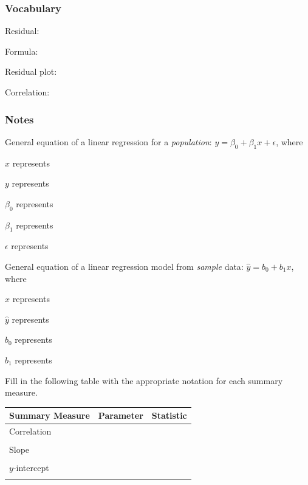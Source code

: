 \documentclass[
]{report}
\newcommand{\rgs}{\vspace{12pt}} %
\newcommand{\rgi}{\hspace{24pt}}  %
\begin{document}

\hypertarget{vocabulary-6}{%
\subsubsection*{Vocabulary}\label{vocabulary-6}}

Residual:
\rgs

\rgi Formula:
\rgs

Residual plot:
\rgs

Correlation:
\rgs

\hypertarget{notes-8}{%
\subsubsection*{Notes}\label{notes-8}}

General equation of a linear regression for a \emph{population}: \(y= \beta_0+ \beta_1 x+\epsilon\), where

\rgi \(x\) represents
\rgs

\rgi \(y\) represents
\rgs

\rgi \(\beta_0\) represents
\rgs

\rgi \(\beta_1\) represents
\rgs

\rgi \(\epsilon\) represents
\rgs

General equation of a linear regression model from \emph{sample} data: \(\hat{y}= b_0+ b_1 x\), where

\rgi \(x\) represents
\rgs

\rgi \(\hat{y}\) represents
\rgs

\rgi \(b_0\) represents
\rgs

\rgi \(b_1\) represents
\rgs

Fill in the following table with the appropriate notation for each summary measure.

\begin{center}
\begin{tabular}{|l|p{2in}|p{2in}|} \hline
Summary Measure & Parameter & Statistic \\ \hline
Correlation & & \\ 
& & \\ \hline
Slope & & \\ 
& & \\ \hline
$y$-intercept & & \\ 
& & \\ \hline
\end{tabular}
\end{center}
\end{document}
